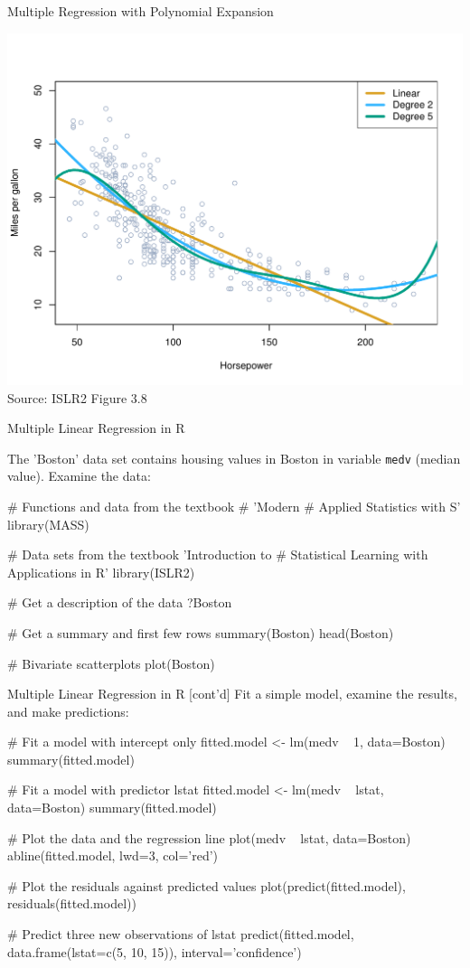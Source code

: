\documentclass[ignorenonframetext,xcolor=x11names]{beamer}
\begin{document}
\begin{frame}{Multiple Regression with Polynomial Expansion}
\centering

\includegraphics[width=.8\textwidth]{../class11/Figures_Chapters_1-6/Chapter3/3_8.pdf} \\

\scriptsize Source: ISLR2 Figure 3.8
\end{frame}

\begin{frame}[fragile]{Multiple Linear Regression in R}

The 'Boston' data set contains housing values in Boston in variable \texttt{medv} (median value). Examine the data:

\begin{Rcode}
# Functions and data from the textbook # 'Modern 
# Applied Statistics with S'
library(MASS)

# Data sets from the textbook 'Introduction to 
# Statistical Learning with Applications in R'
library(ISLR2)

# Get a description of the data
?Boston

# Get a summary and first few rows
summary(Boston)
head(Boston)

# Bivariate scatterplots
plot(Boston)
\end{Rcode}
\end{frame}

\begin{frame}[fragile]{Multiple Linear Regression in R \small [cont'd]}
Fit a simple model, examine the results, and make predictions:
\begin{Rcode}
# Fit a model with intercept only
fitted.model <- lm(medv ~ 1, data=Boston)
summary(fitted.model)

# Fit a model with predictor lstat
fitted.model <- lm(medv ~ lstat, data=Boston)
summary(fitted.model)

# Plot the data and the regression line
plot(medv ~ lstat, data=Boston)
abline(fitted.model, lwd=3, col='red')

# Plot the residuals against predicted values
plot(predict(fitted.model), residuals(fitted.model))

# Predict three new observations of lstat
predict(fitted.model, data.frame(lstat=c(5, 10, 15)),
   interval='confidence')
\end{Rcode}
\end{frame}
\end{document}
